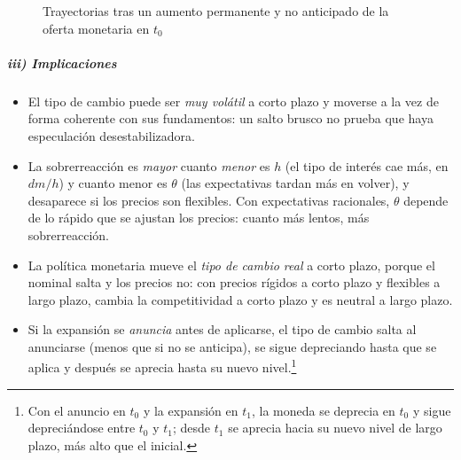 \documentclass[11pt]{article}
\begin{document}
\begin{figure}[H]
\centering
\caption{Trayectorias tras un aumento permanente y no anticipado de la oferta monetaria en $t_0$}\label{fig:dornbusch-trayectorias}
\end{figure}

\subparagraph{iii) Implicaciones}
\begin{itemize}
\item El tipo de cambio puede ser \emph{muy volátil} a corto plazo y moverse a la vez de forma coherente con sus fundamentos: un salto brusco no prueba que haya especulación desestabilizadora.
\item La sobrerreacción es \emph{mayor} cuanto \emph{menor} es $h$ (el tipo de interés cae más, en $dm/h$) y cuanto menor es $\theta$ (las expectativas tardan más en volver), y desaparece si los precios son flexibles. Con expectativas racionales, $\theta$ depende de lo rápido que se ajustan los precios: cuanto más lentos, más sobrerreacción.
\item La política monetaria mueve el \emph{tipo de cambio real} a corto plazo, porque el nominal salta y los precios no: con precios rígidos a corto plazo y flexibles a largo plazo, cambia la competitividad a corto plazo y es neutral a largo plazo.
\item Si la expansión se \emph{anuncia} antes de aplicarse, el tipo de cambio salta al anunciarse (menos que si no se anticipa), se sigue depreciando hasta que se aplica y después se aprecia hasta su nuevo nivel\nocite{Wilson1979Anticipated}.\footnote{Con el anuncio en $t_0$ y la expansión en $t_1$, la moneda se deprecia en $t_0$ y sigue depreciándose entre $t_0$ y $t_1$; desde $t_1$ se aprecia hacia su nuevo nivel de largo plazo, más alto que el inicial.}
\end{itemize}
\end{document}
